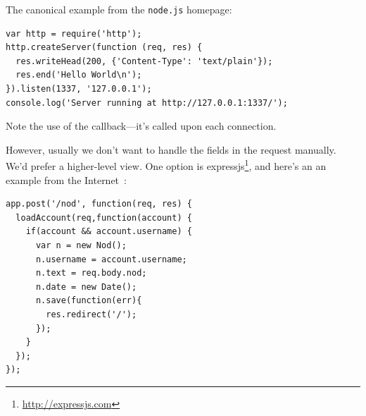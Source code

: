 The canonical example from the {\tt node.js} homepage:
\begin{verbatim}
var http = require('http');
http.createServer(function (req, res) {
  res.writeHead(200, {'Content-Type': 'text/plain'});
  res.end('Hello World\n');
}).listen(1337, '127.0.0.1');
console.log('Server running at http://127.0.0.1:1337/');
\end{verbatim}

Note the use of the callback---it's called upon each connection.

However, usually we don't want to handle the fields in the request manually.
We'd prefer a higher-level view. One option is expressjs\footnote{\url{http://expressjs.com}},
and here's an an example from the Internet~\cite{nod.js}:
\begin{verbatim}
app.post('/nod', function(req, res) {
  loadAccount(req,function(account) {
    if(account && account.username) {
      var n = new Nod();
      n.username = account.username;
      n.text = req.body.nod;
      n.date = new Date();
      n.save(function(err){
        res.redirect('/');
      });
    }
  });
});
\end{verbatim}





